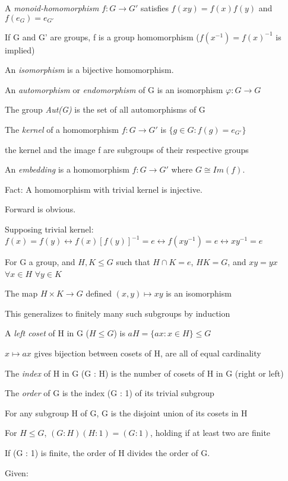 \documentclass[12pt]{article}
\begin{document}
\noindent
A \textit{monoid-homomorphism} $f: G \to G'$ satisfies $f(xy) = f(x)f(y)$ and $f(e_G) = e_{G'}$

If G and G' are groups, f is a group homomorphism ($f(x^{-1}) = f(x)^{-1}$ is implied)

\noindent
An \textit{isomorphism} is a bijective homomorphism.

An \textit{automorphism} or \textit{endomorphism} of G is an isomorphism $\varphi: G \to G$

\noindent
The group \textit{Aut(G)} is the set of all automorphisms of G

\noindent
The \textit{kernel} of a homomorphism $f: G \to G'$ is $\{g \in G : f(g) = e_{G'}\}$

the kernel and the image f are subgroups of their respective groups

\noindent
An \textit{embedding} is a homomorphism $f: G \to G'$ where $G \cong Im(f)$.

\noindent
Fact: A homomorphism with trivial kernel is injective.

Forward is obvious.

Supposing trivial kernel: $f(x) = f(y) \leftrightarrow f(x)[f(y)]^{-1} = e \leftrightarrow f(xy^{-1}) = e \leftrightarrow xy^{-1} = e$

\noindent
For G a group, and $H, K \leq G$ such that $H \cap K = e$, $HK = G$, and $xy=yx$ $\forall x \in H$ $\forall y \in K$

The map $H \times K \to G$ defined $(x, y) \mapsto xy$ is an isomorphism

This generalizes to finitely many such subgroups by induction

\noindent
A \textit{left coset} of H in G ($H \leq G$) is $aH = \{ax : x \in H\} \leq G$

$x \mapsto ax$ gives bijection between cosets of H, are all of equal cardinality

The \textit{index} of H in G (G : H) is the number of cosets of H in G (right or left)

The \textit{order} of G is the index (G : 1) of its trivial subgroup

\noindent
For any subgroup H of G, G is the disjoint union of its cosets in H

\noindent
For $H \leq G$, $(G : H)(H : 1) = (G : 1)$, holding if at least two are finite

If (G : 1) is finite, the order of H divides the order of G.

\noindent
Given:
\end{document}
